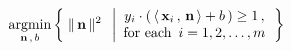 \begin{equation*}
	\underset{\mathbf{n}\,,\,b}{\textnormal{argmin}}
	\left\{\;
		\Vert\,\mathbf{n}\,\Vert^{2}
		\;\;\left\vert
		\begin{array}{c}
			y_{i}\cdot\left(\,\langle\,\mathbf{x}_{i}\,,\,\mathbf{n}\,\rangle+b\,\right) \geq 1\,,
			\\
			\textnormal{for each \,$i = 1,2,\ldots,m$}
			\end{array}
		\right.\right\}
\end{equation*}

